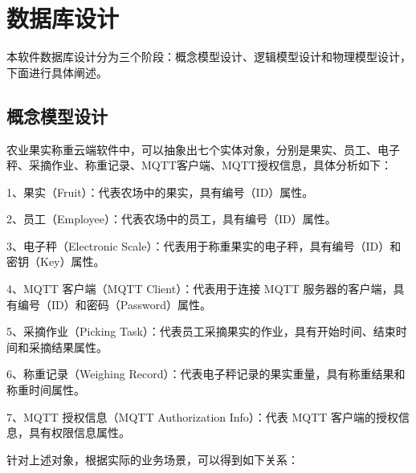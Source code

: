 \section{数据库设计}

本软件数据库设计分为三个阶段：概念模型设计、逻辑模型设计和物理模型设计，下面进行具体阐述。

\subsection{概念模型设计}

农业果实称重云端软件中，可以抽象出七个实体对象，分别是果实、员工、电子秤、采摘作业、称重记录、MQTT客户端、MQTT授权信息，具体分析如下：

1、果实（Fruit）：代表农场中的果实，具有编号（ID）属性。

2、员工（Employee）：代表农场中的员工，具有编号（ID）属性。

3、电子秤（Electronic Scale）：代表用于称重果实的电子秤，具有编号（ID）和密钥（Key）属性。

4、MQTT 客户端（MQTT Client）：代表用于连接 MQTT 服务器的客户端，具有编号（ID）和密码（Password）属性。

5、采摘作业（Picking Task）：代表员工采摘果实的作业，具有开始时间、结束时间和采摘结果属性。

6、称重记录（Weighing Record）：代表电子秤记录的果实重量，具有称重结果和称重时间属性。

7、MQTT 授权信息（MQTT Authorization Info）：代表 MQTT 客户端的授权信息，具有权限信息属性。

针对上述对象，根据实际的业务场景，可以得到如下关系：


